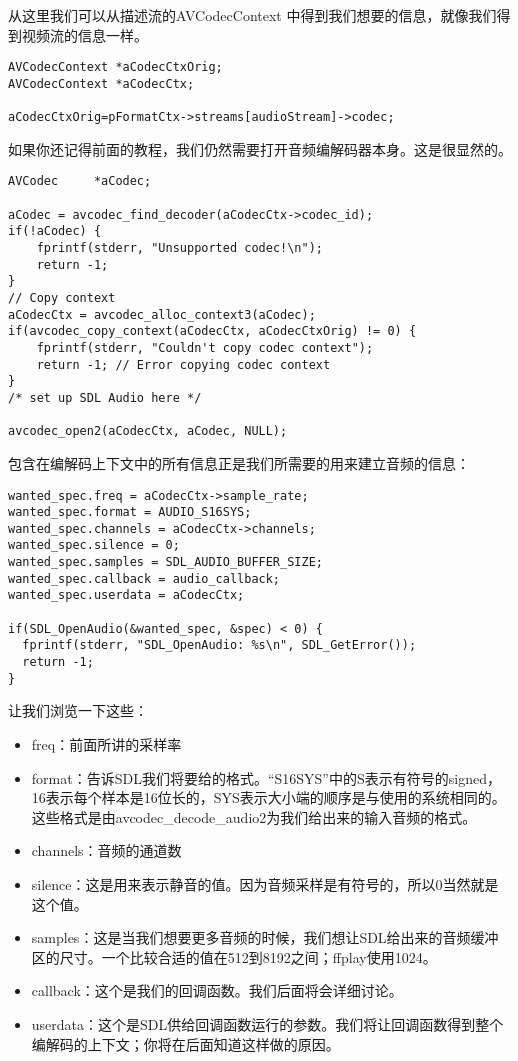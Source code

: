 从这里我们可以从描述流的AVCodecContext 中得到我们想要的信息，就像我们得到视频流的信息一样。

\begin{lstlisting}
AVCodecContext *aCodecCtxOrig;
AVCodecContext *aCodecCtx;

aCodecCtxOrig=pFormatCtx->streams[audioStream]->codec;
\end{lstlisting}

如果你还记得前面的教程，我们仍然需要打开音频编解码器本身。这是很显然的。

\begin{lstlisting}
AVCodec		*aCodec;

aCodec = avcodec_find_decoder(aCodecCtx->codec_id);
if(!aCodec) {
	fprintf(stderr, "Unsupported codec!\n");
	return -1;
}
// Copy context
aCodecCtx = avcodec_alloc_context3(aCodec);
if(avcodec_copy_context(aCodecCtx, aCodecCtxOrig) != 0) {
	fprintf(stderr, "Couldn't copy codec context");
	return -1; // Error copying codec context
}
/* set up SDL Audio here */

avcodec_open2(aCodecCtx, aCodec, NULL);
\end{lstlisting}

包含在编解码上下文中的所有信息正是我们所需要的用来建立音频的信息：

\begin{lstlisting}
wanted_spec.freq = aCodecCtx->sample_rate;
wanted_spec.format = AUDIO_S16SYS;
wanted_spec.channels = aCodecCtx->channels;
wanted_spec.silence = 0;
wanted_spec.samples = SDL_AUDIO_BUFFER_SIZE;
wanted_spec.callback = audio_callback;
wanted_spec.userdata = aCodecCtx;

if(SDL_OpenAudio(&wanted_spec, &spec) < 0) {
  fprintf(stderr, "SDL_OpenAudio: %s\n", SDL_GetError());
  return -1;
}
\end{lstlisting}

让我们浏览一下这些：
\begin{itemize}
  \item freq：前面所讲的采样率

  \item format：告诉SDL我们将要给的格式。“S16SYS”中的S表示有符号的signed，16表示每个样本是16位长的，SYS表示大小端的顺序是与使用的系统相同的。这些格式是由avcodec_decode_audio2为我们给出来的输入音频的格式。

  \item channels：音频的通道数

  \item silence：这是用来表示静音的值。因为音频采样是有符号的，所以0当然就是这个值。

  \item samples：这是当我们想要更多音频的时候，我们想让SDL给出来的音频缓冲区的尺寸。一个比较合适的值在512到8192之间；ffplay使用1024。

  \item callback：这个是我们的回调函数。我们后面将会详细讨论。

  \item userdata：这个是SDL供给回调函数运行的参数。我们将让回调函数得到整个编解码的上下文；你将在后面知道这样做的原因。

\end{itemize}

